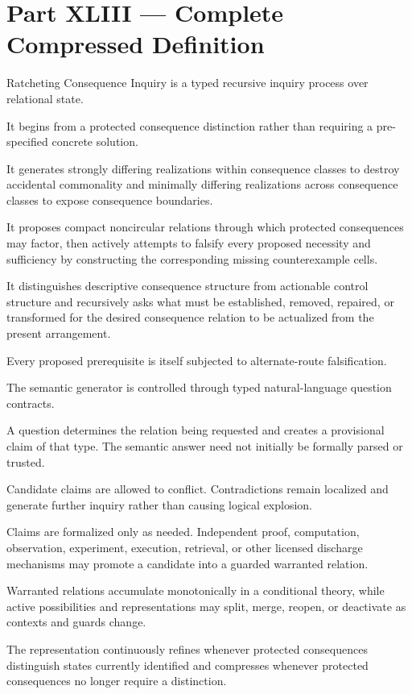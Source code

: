 \documentclass[
]{article}
\begin{document}
\section{Part XLIII --- Complete Compressed
Definition}\label{part-xliii-complete-compressed-definition}

Ratcheting Consequence Inquiry is a typed recursive inquiry process over
relational state.

It begins from a protected consequence distinction rather than requiring
a pre-specified concrete solution.

It generates strongly differing realizations within consequence classes
to destroy accidental commonality and minimally differing realizations
across consequence classes to expose consequence boundaries.

It proposes compact noncircular relations through which protected
consequences may factor, then actively attempts to falsify every
proposed necessity and sufficiency by constructing the corresponding
missing counterexample cells.

It distinguishes descriptive consequence structure from actionable
control structure and recursively asks what must be established,
removed, repaired, or transformed for the desired consequence relation
to be actualized from the present arrangement.

Every proposed prerequisite is itself subjected to alternate-route
falsification.

The semantic generator is controlled through typed natural-language
question contracts.

A question determines the relation being requested and creates a
provisional claim of that type. The semantic answer need not initially
be formally parsed or trusted.

Candidate claims are allowed to conflict. Contradictions remain
localized and generate further inquiry rather than causing logical
explosion.

Claims are formalized only as needed. Independent proof, computation,
observation, experiment, execution, retrieval, or other licensed
discharge mechanisms may promote a candidate into a guarded warranted
relation.

Warranted relations accumulate monotonically in a conditional theory,
while active possibilities and representations may split, merge, reopen,
or deactivate as contexts and guards change.

The representation continuously refines whenever protected consequences
distinguish states currently identified and compresses whenever
protected consequences no longer require a distinction.
\end{document}
